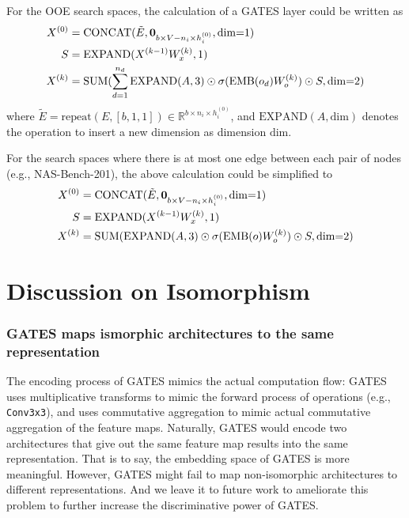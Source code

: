 \documentclass[runningheads]{llncs}
\newcommand{\expand}{\mbox{EXPAND}}
\begin{document}
For the OOE search spaces, the calculation of a GATES layer could be written as
\begin{equation}
\begin{aligned}
X^{(0)} &= \mbox{CONCAT}(\tilde{E}, {\bf 0}_{b \times V-n_i \times h_i^{(0)}}, \mbox{dim=1})\\
S &= \expand(X^{(k-1)} W^{(k)}_x, 1)\\
X^{(k)} &= \mbox{SUM}(\sum_{d=1}^{n_d} \expand(A, 3) \odot \sigma(\mbox{EMB}(o_d) W^{(k)}_o) \odot S, \mbox{dim=2})
\end{aligned}
\label{eq:gates_enas}
\end{equation}
where $\tilde{E} = \mbox{repeat}(E, [b, 1, 1]) \in \mathbb{R}^{b \times n_i \times h^{(0)}_i}$, and $\expand(A, \mbox{dim})$ denotes the operation to insert a new dimension as dimension \textit{$\mbox{dim}$}.

For the search spaces where there is at most one edge between each pair of nodes (e.g., NAS-Bench-201), the above calculation could be simplified to
\begin{equation}
\begin{aligned}
X^{(0)} &= \mbox{CONCAT}(\tilde{E}, {\bf 0}_{b \times V-n_i \times h_i^{(0)}}, \mbox{dim=1})\\
S &= \expand(X^{(k-1)} W^{(k)}_x, 1)\\
X^{(k)} &= \mbox{SUM}(\expand(A, 3) \odot \sigma(\mbox{EMB}(o) W^{(k)}_o) \odot S, \mbox{dim=2})
\end{aligned}
\label{eq:gates_enas}
\end{equation}



\section{Discussion on Isomorphism}

\subsubsection{GATES maps ismorphic architectures to the same representation}
The encoding process of GATES mimics the actual computation flow: GATES uses multiplicative transforms to mimic the forward process of operations (e.g., \texttt{Conv3x3}), and uses commutative aggregation to mimic actual commutative aggregation of the feature maps.
Naturally, GATES would encode two architectures that give out the same feature map results into the same representation. That is to say, the embedding space of GATES is more meaningful. However, GATES might fail to map non-isomorphic architectures to different representations. And we leave it to future work to ameliorate this problem to further increase the discriminative power of GATES.
\end{document}
